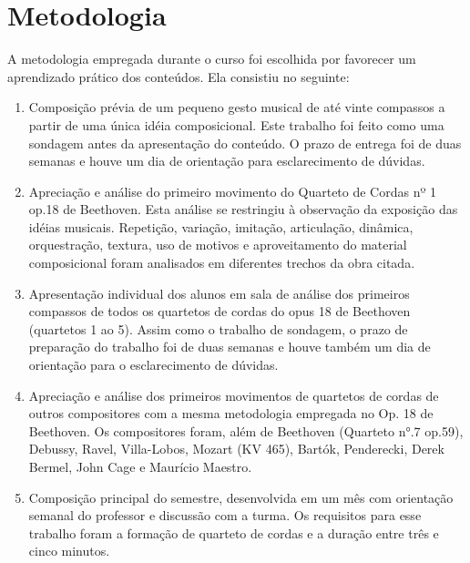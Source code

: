 \documentclass[12pt]{article}
\begin{document}
\section{Metodologia}
\label{sec:metodologia}

A metodologia empregada durante o curso foi escolhida por favorecer um
aprendizado prático dos conteúdos. Ela consistiu no seguinte:

\begin{enumerate}
\item Composição prévia de um pequeno gesto musical de até vinte
  compassos a partir de uma única idéia composicional. Este trabalho
  foi feito como uma sondagem antes da apresentação do conteúdo. O
  prazo de entrega foi de duas semanas e houve um dia de orientação
  para esclarecimento de dúvidas.
\item Apreciação e análise do primeiro movimento do Quarteto de Cordas
  nº 1 op.18 de Beethoven. Esta análise se restringiu à observação da
  exposição das idéias musicais. Repetição, variação, imitação,
  articulação, dinâmica, orquestração, textura, uso de motivos e
  aproveitamento do material composicional foram analisados em
  diferentes trechos da obra citada.
\item Apresentação individual dos alunos em sala de análise dos
  primeiros compassos de todos os quartetos de cordas do opus 18 de
  Beethoven (quartetos 1 ao 5). Assim como o trabalho de sondagem, o
  prazo de preparação do trabalho foi de duas semanas e houve também
  um dia de orientação para o esclarecimento de dúvidas.
\item Apreciação e análise dos primeiros movimentos de quartetos de
  cordas de outros compositores com a mesma metodologia empregada no
  Op. 18 de Beethoven. Os compositores foram, além de Beethoven
  (Quarteto n°.7 op.59), Debussy, Ravel, Villa-Lobos, Mozart (KV 465),
  Bartók, Penderecki, Derek Bermel, John Cage e Maurício Maestro.

\item Composição principal do semestre, desenvolvida em um mês com
  orientação semanal do professor e discussão com a turma. Os
  requisitos para esse trabalho foram a formação de quarteto de cordas
  e a duração entre três e cinco minutos.


\end{enumerate}
\end{document}
